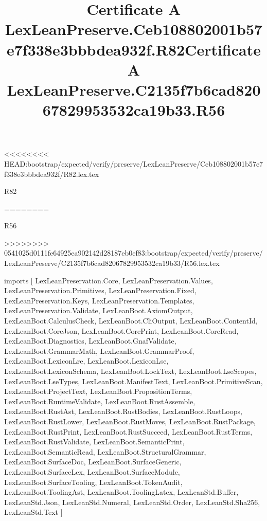 <<<<<<<< HEAD:bootstrap/expected/verify/preserve/LexLeanPreserve/Ceb108802001b57e7f338e3bbbdea932f/R82.lex.tex
\begin{lexlean}{R82}
\title{Certificate A LexLeanPreserve.Ceb108802001b57e7f338e3bbbdea932f.R82}
========
\begin{lexlean}{R56}
\title{Certificate A LexLeanPreserve.C2135f7b6cad82067829953532ca19b33.R56}
>>>>>>>> 0541025d0111fe64925ea902142d28187eb0ef83:bootstrap/expected/verify/preserve/LexLeanPreserve/C2135f7b6cad82067829953532ca19b33/R56.lex.tex
\begin{coremodule}
imports [
  LexLeanPreservation.Core,
  LexLeanPreservation.Values,
  LexLeanPreservation.Primitives,
  LexLeanPreservation.Fixed,
  LexLeanPreservation.Keys,
  LexLeanPreservation.Templates,
  LexLeanPreservation.Validate,
  LexLeanBoot.AxiomOutput,
  LexLeanBoot.CalculusCheck,
  LexLeanBoot.CliOutput,
  LexLeanBoot.ContentId,
  LexLeanBoot.CoreJson,
  LexLeanBoot.CorePrint,
  LexLeanBoot.CoreRead,
  LexLeanBoot.Diagnostics,
  LexLeanBoot.GnafValidate,
  LexLeanBoot.GrammarMath,
  LexLeanBoot.GrammarProof,
  LexLeanBoot.LexiconLre,
  LexLeanBoot.LexiconLse,
  LexLeanBoot.LexiconSchema,
  LexLeanBoot.LockText,
  LexLeanBoot.LseScopes,
  LexLeanBoot.LseTypes,
  LexLeanBoot.ManifestText,
  LexLeanBoot.PrimitiveScan,
  LexLeanBoot.ProjectText,
  LexLeanBoot.PropositionTerms,
  LexLeanBoot.RuntimeValidate,
  LexLeanBoot.RustAssemble,
  LexLeanBoot.RustAst,
  LexLeanBoot.RustBodies,
  LexLeanBoot.RustLoops,
  LexLeanBoot.RustLower,
  LexLeanBoot.RustMoves,
  LexLeanBoot.RustPackage,
  LexLeanBoot.RustPrint,
  LexLeanBoot.RustSucceed,
  LexLeanBoot.RustTerms,
  LexLeanBoot.RustValidate,
  LexLeanBoot.SemanticPrint,
  LexLeanBoot.SemanticRead,
  LexLeanBoot.StructuralGrammar,
  LexLeanBoot.SurfaceDoc,
  LexLeanBoot.SurfaceGeneric,
  LexLeanBoot.SurfaceLex,
  LexLeanBoot.SurfaceModule,
  LexLeanBoot.SurfaceTooling,
  LexLeanBoot.TokenAudit,
  LexLeanBoot.ToolingAst,
  LexLeanBoot.ToolingLatex,
  LexLeanStd.Buffer,
  LexLeanStd.Json,
  LexLeanStd.Numeral,
  LexLeanStd.Order,
  LexLeanStd.Sha256,
  LexLeanStd.Text
]


\end{coremodule}
\end{lexlean}
\end{lexlean}
